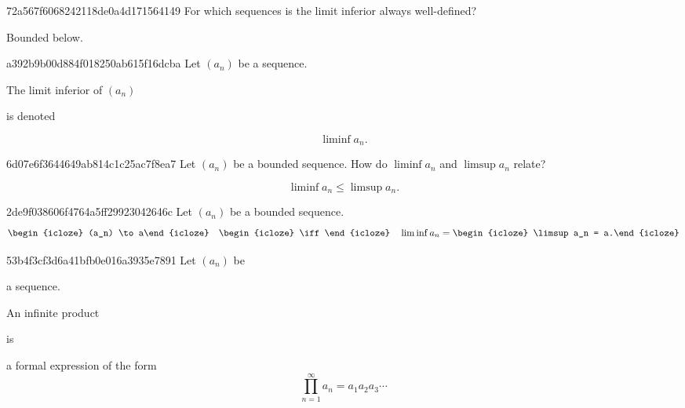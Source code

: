 \begin{note}{72a567f6068242118de0a4d171564149}
    For which sequences is the limit inferior always well-defined?

    \begin{cloze}{1}
        Bounded below.
    \end{cloze}
\end{note}

\begin{note}{a392b9b00d884f018250ab615f16dcba}
    Let \({ (a_n) }\) be a sequence.
    \begin{icloze}{2}The limit inferior of \({ (a_n) }\)\end{icloze} is denoted
    \begin{icloze}{1}
        \[
            \liminf a_n.
        \]
    \end{icloze}
\end{note}

\begin{note}{6d07e6f3644649ab814c1c25ac7f8ea7}
    Let \({ (a_n) }\) be a bounded sequence.
    How do \({ \liminf a_n }\) and \({ \limsup a_n }\) relate?

    \begin{cloze}{1}
        \[
            \liminf a_n \leq \limsup a_n.
        \]
    \end{cloze}
\end{note}

\begin{note}{2de9f038606f4764a5ff29923042646c}
    Let \({ (a_n) }\) be a bounded sequence.
    \[
        \begin{icloze}{2}(a_n) \to a\end{icloze}
        \quad \begin{icloze}{3}\iff\end{icloze} \quad
        \liminf a_n = \begin{icloze}{1}\limsup a_n = a.\end{icloze}
    \]
\end{note}

\begin{note}{53b4f3cf3d6a41bfb0e016a3935e7891}
    Let \({ (a_n) }\) be \begin{icloze}{3}a sequence.\end{icloze}
    \begin{icloze}{2}An infinite product\end{icloze} is
    \begin{icloze}{1}
        a formal expression of the form
        \[
            \prod_{n = 1}^{\infty} a_n = a_1 a_2 a_3 \cdots
        \]
    \end{icloze}
\end{note}

